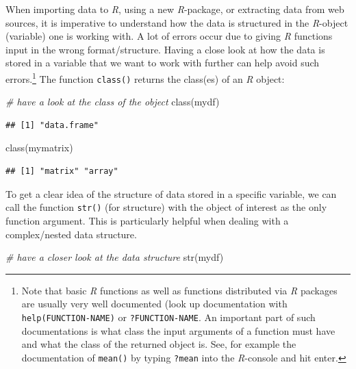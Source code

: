 \documentclass[
  12pt,
]{style/krantz}
\newenvironment{Shaded}{\begin{snugshade}}{\end{snugshade}}
\newcommand{\CommentTok}[1]{\textcolor[rgb]{0.56,0.35,0.01}{\textit{#1}}}
\newcommand{\FunctionTok}[1]{\textcolor[rgb]{0.00,0.00,0.00}{#1}}
\newcommand{\NormalTok}[1]{#1}
\begin{document}
When importing data to \emph{R}, using a new \emph{R}-package, or extracting data from web sources, it is imperative to understand how the data is structured in the \emph{R}-object (variable) one is working with. A lot of errors occur due to giving \emph{R} functions input in the wrong format/structure. Having a close look at how the data is stored in a variable that we want to work with further can help avoid such errors.\footnote{Note that basic \emph{R} functions as well as functions distributed via \emph{R} packages are usually very well documented (look up documentation with \texttt{help(FUNCTION-NAME)} or \texttt{?FUNCTION-NAME}. An important part of such documentations is what class the input arguments of a function must have and what the class of the returned object is. See, for example the documentation of \texttt{mean()} by typing \texttt{?mean} into the \emph{R}-console and hit enter.} The function \texttt{class()} returns the class(es) of an \emph{R} object:

\begin{Shaded}
\begin{Highlighting}[]
\CommentTok{\# have a look at the class of the object}
\FunctionTok{class}\NormalTok{(mydf)}
\end{Highlighting}
\end{Shaded}

\begin{verbatim}
## [1] "data.frame"
\end{verbatim}

\begin{Shaded}
\begin{Highlighting}[]
\FunctionTok{class}\NormalTok{(mymatrix)}
\end{Highlighting}
\end{Shaded}

\begin{verbatim}
## [1] "matrix" "array"
\end{verbatim}

To get a clear idea of the structure of data stored in a specific variable, we can call the function \texttt{str()} (for structure) with the object of interest as the only function argument. This is particularly helpful when dealing with a complex/nested data structure.

\begin{Shaded}
\begin{Highlighting}[]
\CommentTok{\# have a closer look at the data structure}
\FunctionTok{str}\NormalTok{(mydf)}
\end{Highlighting}
\end{Shaded}
\end{document}
